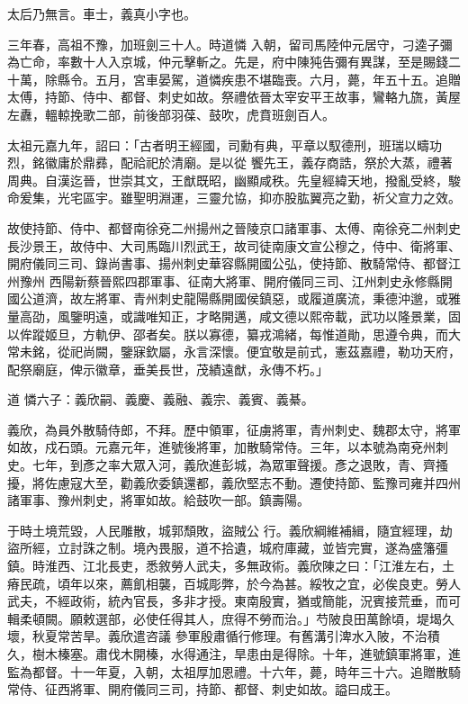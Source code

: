 \begin{pinyinscope}
 太后乃無言。車士，義真小字也。



 三年春，高祖不豫，加班劍三十人。時道憐
 入朝，留司馬陸仲元居守，刁逵子彌為亡命，率數十人入京城，仲元擊斬之。先是，府中陳㹠告彌有異謀，至是賜錢二十萬，除縣令。五月，宮車晏駕，道憐疾患不堪臨喪。六月，薨，年五十五。追贈太傅，持節、侍中、都督、刺史如故。祭禮依晉太宰安平王故事，鸞輅九旒，黃屋左纛，轀輬挽歌二部，前後部羽葆、鼓吹，虎賁班劍百人。



 太祖元嘉九年，詔曰：「古者明王經國，司勳有典，平章以馭德刑，班瑞以疇功烈，銘徽庸於鼎彞，配祫祀於清廟。是以從
 饗先王，義存商誥，祭於大蒸，禮著周典。自漢迄晉，世崇其文，王猷既昭，幽顯咸秩。先皇經緯天地，撥亂受終，駿命爰集，光宅區宇。雖聖明淵運，三靈允協，抑亦股肱翼亮之勤，祈父宣力之效。



 故使持節、侍中、都督南徐兗二州揚州之晉陵京口諸軍事、太傅、南徐兗二州刺史長沙景王，故侍中、大司馬臨川烈武王，故司徒南康文宣公穆之，侍中、衛將軍、開府儀同三司、錄尚書事、揚州刺史華容縣開國公弘，使持節、散騎常侍、都督江州豫州
 西陽新蔡晉熙四郡軍事、征南大將軍、開府儀同三司、江州刺史永修縣開國公道濟，故左將軍、青州刺史龍陽縣開國侯鎮惡，或履道廣流，秉德沖邈，或雅量高劭，風鑒明遠，或識唯知正，才略開邁，咸文德以熙帝載，武功以隆景業，固以侔蹤姬旦，方軌伊、邵者矣。朕以寡德，纂戎鴻緒，每惟道勛，思遵令典，而大常未銘，從祀尚闕，鑒寐欽屬，永言深懷。便宜敬是前式，憲茲嘉禮，勒功天府，配祭廟庭，俾示徽章，垂美長世，茂績遠猷，永傳不朽。」



 道
 憐六子：義欣嗣、義慶、義融、義宗、義賓、義綦。



 義欣，為員外散騎侍郎，不拜。歷中領軍，征虜將軍，青州刺史、魏郡太守，將軍如故，戍石頭。元嘉元年，進號後將軍，加散騎常侍。三年，以本號為南兗州刺史。七年，到彥之率大眾入河，義欣進彭城，為眾軍聲援。彥之退敗，青、齊搔擾，將佐慮寇大至，勸義欣委鎮還都，義欣堅志不動。遷使持節、監豫司雍并四州諸軍事、豫州刺史，將軍如故。給鼓吹一部。鎮壽陽。



 于時土境荒毀，人民雕散，城郭頹敗，盜賊公
 行。義欣綱維補緝，隨宜經理，劫盜所經，立討誅之制。境內畏服，道不拾遺，城府庫藏，並皆完實，遂為盛籓彊鎮。時淮西、江北長吏，悉敘勞人武夫，多無政術。義欣陳之曰：「江淮左右，土瘠民疏，頃年以來，薦飢相襲，百城彫弊，於今為甚。綏牧之宜，必俟良吏。勞人武夫，不經政術，統內官長，多非才授。東南殷實，猶或簡能，況賓接荒垂，而可輯柔頓闕。願敕選部，必使任得其人，庶得不勞而治。」芍陂良田萬餘頃，堤堨久壞，秋夏常苦旱。義欣遣咨議
 參軍殷肅循行修理。有舊溝引渒水入陂，不治積久，樹木榛塞。肅伐木開榛，水得通注，旱患由是得除。十年，進號鎮軍將軍，進監為都督。十一年夏，入朝，太祖厚加恩禮。十六年，薨，時年三十六。追贈散騎常侍、征西將軍、開府儀同三司，持節、都督、刺史如故。謚曰成王。




\end{pinyinscope}
